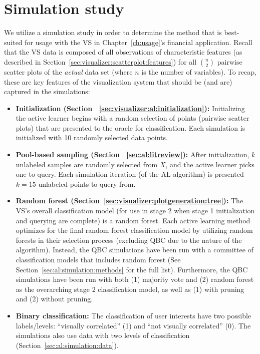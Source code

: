 \section{Simulation study}
\label{sec:al:simulations}

We utilize a simulation study in order to determine the method that is 
best-suited for usage with the VS in Chapter~\ref{ch:usage}'s financial 
application. Recall that the VS data is composed of all observations of 
characteristic features (as described in 
Section~\ref{sec:visualizer:scatterplot:features}) 
for all $n\choose 2$ pairwise scatter plots of the \textit{actual} data set 
(where $n$ is the number of variables). To 
recap, these are key features of the visualization system that 
should be (and are) captured in the simulations:

\tablespacing
\begin{itemize}
	\item \textbf{Initialization (Section 
	~\ref{sec:visualizer:al:initialization}):} 
	Initializing the active learner begins with a random selection of
	points (pairwise scatter plots) that are presented to the oracle for 
	classification. Each simulation is initialized with 10 randomly selected 
	data points.
	
	\item \textbf{Pool-based sampling (Section ~\ref{sec:al:litreview}):} After 
	initialization, $k$ unlabeled samples are randomly selected from $X$, and 
	the active learner picks one to query. Each simulation iteration (of the AL 
	algorithm) is presented $k=15$ unlabeled points to query from.
	
	\item \textbf{Random forest 
	(Section~\ref{sec:visualizer:plotgeneration:tree}):} The VS's overall 
	classification model (for use in stage 2 when stage 1 initialization and 
	querying are complete) is a random forest. Each active learning method 
	optimizes for the 
	final random forest classification model by utilizing random forests in 
	their selection process (excluding QBC due to the nature of the 
	algorithm). Instead, the QBC simulations have been run with a committee of 
	classification models that includes random forest (See 
	Section~\ref{sec:al:simulation:methods} for the full list). Furthermore, 
	the QBC simulations have been run with both (1) majority vote and (2) 
	random forest as the overarching stage 2 classification model, as well as 
	(1) with pruning and (2) without pruning.
	
	\item \textbf{Binary classification:} The classification of user 
	interests have two possible labels/levels: ``visually correlated'' (1) and 
	``not visually correlated'' (0). The simulations also use data with two 
	levels of classification (Section~\ref{sec:al:simulation:data}).
\end{itemize}
\bodyspacing

